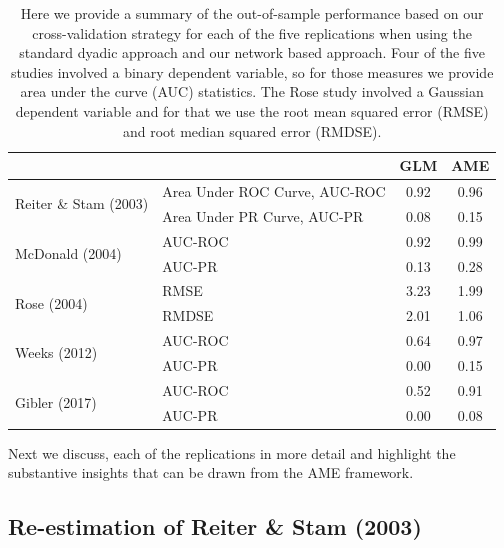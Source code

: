 \begin{table}[ht]
\centering
	\begin{tabular}{l|l cc}
	~ & ~ & GLM & AME \\
	\toprule
\multirow{2}{*}{Reiter \& Stam (2003)} & Area Under ROC Curve, AUC-ROC & 0.92 & {0.96} \\
		~ & Area Under PR Curve, AUC-PR & 0.08 &  {0.15} \\		\midrule
\multirow{2}{*}{McDonald (2004)} & AUC-ROC & 0.92 &  {0.99} \\
		~ & AUC-PR & 0.13 &  {0.28} \\		\midrule
\multirow{2}{*}{Rose (2004)} & RMSE & 3.23 &  {1.99} \\
		~ & RMDSE & 2.01 &  {1.06} \\	\midrule
\multirow{2}{*}{Weeks (2012)} & AUC-ROC & 0.64 &  {0.97} \\
		~ & AUC-PR & 0.00 &  {0.15} \\		\midrule
\multirow{2}{*}{Gibler (2017)} & AUC-ROC & 0.52 &  {0.91} \\
		~ & AUC-PR & 0.00 &  {0.08} \\			\bottomrule
	\end{tabular}
	\caption{Here we provide a summary of the out-of-sample performance based on our cross-validation strategy for each of the five replications when using the standard dyadic approach and our network based approach. Four of the five studies involved a binary dependent variable, so for those measures we provide area under the curve (AUC) statistics. The Rose study involved a Gaussian dependent variable and for that we use the root mean squared error (RMSE) and root median squared error (RMDSE). %
	}
	\label{tab:modelPerfSumm}
\end{table}
\FloatBarrier

Next we discuss, each of the replications in more detail and highlight the substantive insights that can be drawn from the AME framework.

\subsection{Re-estimation of Reiter \& Stam (2003)}


